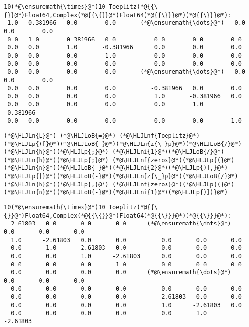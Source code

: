 \documentclass[12pt,a4paper]{article}
\newcommand{\HLJLn}[1]{#1}
\newcommand{\HLJLnf}[1]{\textcolor[RGB]{66,102,213}{#1}}
\newcommand{\HLJLni}[1]{\textcolor[RGB]{59,151,46}{#1}}
\newcommand{\HLJLoB}[1]{\textcolor[RGB]{102,102,102}{\textbf{#1}}}
\newcommand{\HLJLp}[1]{#1}
\begin{document}
\begin{lstlisting}
10(*@\ensuremath{\times}@*)10 Toeplitz(*@{{\{}}@*)Float64,Complex(*@{{\{}}@*)Float64(*@{{\}}}@*)(*@{{\}}}@*):
 1.0  -0.381966   0.0        0.0       (*@\ensuremath{\dots}@*)   0.0        0.0        0.0     
 0.0   1.0       -0.381966   0.0           0.0        0.0        0.0     
 0.0   0.0        1.0       -0.381966      0.0        0.0        0.0     
 0.0   0.0        0.0        1.0           0.0        0.0        0.0     
 0.0   0.0        0.0        0.0           0.0        0.0        0.0     
 0.0   0.0        0.0        0.0       (*@\ensuremath{\dots}@*)   0.0        0.0        0.0     
 0.0   0.0        0.0        0.0          -0.381966   0.0        0.0     
 0.0   0.0        0.0        0.0           1.0       -0.381966   0.0     
 0.0   0.0        0.0        0.0           0.0        1.0       -0.381966
 0.0   0.0        0.0        0.0           0.0        0.0        1.0
\end{lstlisting}


\begin{lstlisting}
(*@\HLJLn{L}@*) (*@\HLJLoB{=}@*) (*@\HLJLnf{Toeplitz}@*)(*@\HLJLp{([}@*)(*@\HLJLoB{-}@*)(*@\HLJLn{z{\_}p}@*)(*@\HLJLoB{/}@*)(*@\HLJLn{h}@*)(*@\HLJLp{;}@*) (*@\HLJLni{1}@*)(*@\HLJLoB{/}@*)(*@\HLJLn{h}@*)(*@\HLJLp{;}@*) (*@\HLJLnf{zeros}@*)(*@\HLJLp{(}@*)(*@\HLJLn{n}@*)(*@\HLJLoB{-}@*)(*@\HLJLni{2}@*)(*@\HLJLp{)],}@*) (*@\HLJLp{[}@*)(*@\HLJLoB{-}@*)(*@\HLJLn{z{\_}p}@*)(*@\HLJLoB{/}@*)(*@\HLJLn{h}@*)(*@\HLJLp{;}@*) (*@\HLJLnf{zeros}@*)(*@\HLJLp{(}@*)(*@\HLJLn{n}@*)(*@\HLJLoB{-}@*)(*@\HLJLni{1}@*)(*@\HLJLp{)])}@*)
\end{lstlisting}

\begin{lstlisting}
10(*@\ensuremath{\times}@*)10 Toeplitz(*@{{\{}}@*)Float64,Complex(*@{{\{}}@*)Float64(*@{{\}}}@*)(*@{{\}}}@*):
 -2.61803   0.0       0.0       0.0      (*@\ensuremath{\dots}@*)   0.0       0.0       0.0    
  1.0      -2.61803   0.0       0.0          0.0       0.0       0.0    
  0.0       1.0      -2.61803   0.0          0.0       0.0       0.0    
  0.0       0.0       1.0      -2.61803      0.0       0.0       0.0    
  0.0       0.0       0.0       1.0          0.0       0.0       0.0    
  0.0       0.0       0.0       0.0      (*@\ensuremath{\dots}@*)   0.0       0.0       0.0    
  0.0       0.0       0.0       0.0          0.0       0.0       0.0    
  0.0       0.0       0.0       0.0         -2.61803   0.0       0.0    
  0.0       0.0       0.0       0.0          1.0      -2.61803   0.0    
  0.0       0.0       0.0       0.0          0.0       1.0      -2.61803
\end{lstlisting}
\end{document}

